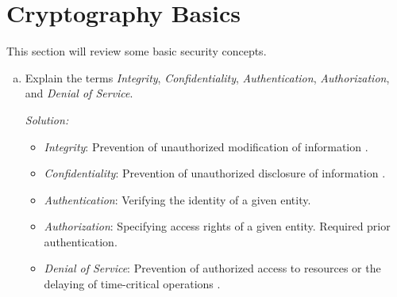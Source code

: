 \documentclass[a4paper,11pt]{article}
\newcommand{\includeonlyinsolution}[1]{\ifsolution#1\fi}
\newenvironment{solution}%
{\par{\noindent\small\textit{Solution:}}\vspace{-12pt}\begin{framed}}%
{\end{framed}\par}
\begin{document}
\section{Cryptography Basics}
This section will review some basic security concepts.
\begin{enumerate}[(a)]
\item Explain the terms \emph{Integrity}, \emph{Confidentiality},
  \emph{Authentication}, \emph{Authorization}, and 
  \emph{Denial of Service}.
\includeonlyinsolution{\begin{solution}
\begin{itemize}
  \item \emph{Integrity}: Prevention of unauthorized modification of information \cite{CompSec}.
  \item \emph{Confidentiality}: Prevention of unauthorized disclosure of information \cite{CompSec}.
  \item \emph{Authentication}: Verifying the identity of a given entity.
  \item \emph{Authorization}: Specifying access rights of a given entity. Required prior authentication.
  \item \emph{Denial of Service}: Prevention of authorized access to resources
  or the delaying of time-critical operations \cite{ISO7498}.
\end{itemize}
\end{solution}}


\end{enumerate}
\end{document}
